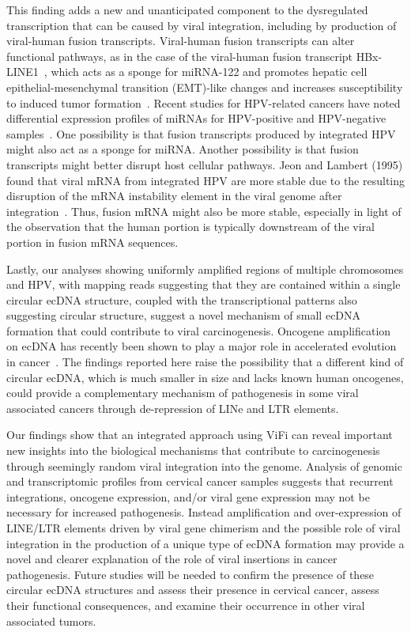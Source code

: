 \documentclass[a4,center,fleqn]{NAR}
\begin{document}
This finding adds a new and unanticipated component to the dysregulated transcription that can be caused by viral integration, including by production of viral-human fusion transcripts. Viral-human fusion transcripts can alter functional
pathways, as in the case of the viral-human fusion transcript
HBx-LINE1~\cite{Lau2014,Liang2016}, which acts as a sponge for
miRNA-122 and promotes hepatic cell epithelial-mesenchymal transition
(EMT)-like changes and increases susceptibility to induced tumor
formation~\cite{Liang2016}.  Recent studies for HPV-related cancers
have noted differential expression profiles of miRNAs for HPV-positive
and HPV-negative samples~\cite{Lajer2012,Gao2016}.  One possibility is
that fusion transcripts produced by integrated HPV might also act as a
sponge for miRNA.  Another possibility is that fusion transcripts
might better disrupt host cellular pathways.  Jeon and Lambert (1995)
found that viral mRNA from integrated HPV are more stable due to the
resulting disruption of the mRNA instability element in the viral
genome after integration~\cite{Jeon1995}.  Thus, fusion mRNA might
also be more stable, especially in light of the observation that the
human portion is typically downstream of the viral portion in fusion
mRNA sequences.

Lastly, our analyses showing uniformly amplified regions of multiple chromosomes and HPV, with mapping reads suggesting that they are contained within a single circular ecDNA structure, coupled with the transcriptional patterns also suggesting circular structure, suggest a novel mechanism of small ecDNA formation that could contribute to viral carcinogenesis. Oncogene amplification on ecDNA has recently been shown to play a major role in accelerated evolution in cancer~\cite{Turner2017}. The findings reported here raise the possibility that a different kind of circular ecDNA, which is much smaller in size and lacks known human oncogenes, could provide a complementary mechanism of pathogenesis in some viral associated cancers through de-repression of LINe and LTR elements. 

Our findings show that an integrated approach using ViFi can reveal important new insights into the biological mechanisms that contribute to carcinogenesis through seemingly random viral integration into the genome.  Analysis of genomic and transcriptomic profiles from cervical cancer samples suggests that recurrent integrations, oncogene expression, and/or viral gene expression may not be necessary for increased pathogenesis. Instead amplification and over-expression of LINE/LTR elements driven by viral gene chimerism and the possible role of viral integration in the production of a unique type of ecDNA formation may provide a novel and clearer explanation of the role of viral insertions in cancer pathogenesis.  Future studies will be needed to confirm the presence of these circular ecDNA structures and assess their presence in cervical cancer, assess their functional consequences, and examine their occurrence in other viral associated tumors.
\end{document}
